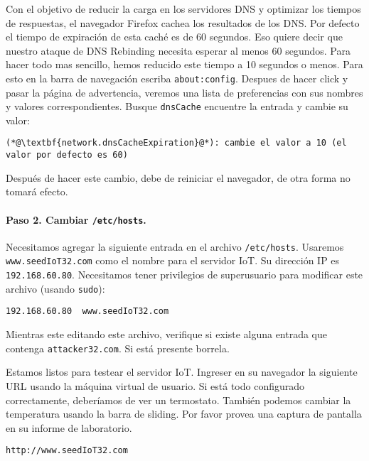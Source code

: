 Con el objetivo de reducir la carga en los servidores DNS y optimizar los tiempos de respuestas, el navegador Firefox cachea los resultados de los DNS. Por defecto el tiempo de expiración de esta caché es de 60 segundos. Eso quiere decir que nuestro ataque de DNS Rebinding necesita esperar al menos 60 segundos. Para hacer todo mas sencillo, hemos reducido este tiempo a 10 segundos o menos. Para esto en la barra de navegación escriba  \texttt{about:config}. 
Despues de hacer click y pasar la página de advertencia, veremos una lista de preferencias con sus nombres y valores correspondientes.
Busque \texttt{dnsCache} encuentre la entrada y cambie su valor:

\begin{lstlisting}
(*@\textbf{network.dnsCacheExpiration}@*): cambie el valor a 10 (el valor por defecto es 60)
\end{lstlisting}

Después de hacer este cambio, debe de reiniciar el navegador, de otra forma no tomará efecto.


\paragraph{Paso 2. Cambiar \texttt{/etc/hosts}.}
Necesitamos agregar la siguiente entrada en el archivo \texttt{/etc/hosts}. Usaremos \texttt{www.seedIoT32.com} como el nombre para el servidor IoT. Su dirección IP es \texttt{192.168.60.80}. 
Necesitamos tener privilegios de superusuario para modificar este archivo (usando \texttt{sudo}): 

\begin{lstlisting}
192.168.60.80  www.seedIoT32.com
\end{lstlisting}

Mientras este editando este archivo, verifique si existe alguna entrada que contenga \texttt{attacker32.com}. Si está presente borrela.

Estamos listos para testear el servidor IoT. Ingreser en su navegador la siguiente URL usando la máquina virtual de usuario. Si está todo configurado correctamente, deberíamos de ver un termostato. También podemos cambiar la temperatura usando la barra de sliding. Por favor provea una captura de pantalla en su informe de laboratorio.

\begin{lstlisting}
http://www.seedIoT32.com
\end{lstlisting}
 

